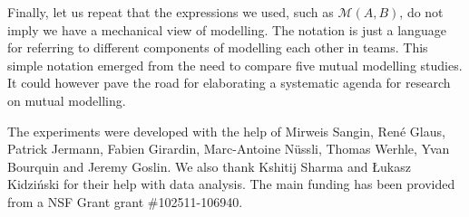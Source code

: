 \documentclass[natbib]{svjour3}
\newcommand{\gmodel}[2]{{$\mathcal{M}(#1, #2)$}}
\begin{document}
Finally, let us repeat that the expressions we used, such as \gmodel{A}{B}, do
not imply we have a mechanical view of modelling. The notation is just a language for
referring to different components of modelling each other in teams.  This simple
notation emerged from the need to compare five mutual modelling studies. It
could however pave the road for elaborating a systematic agenda for research on
mutual modelling.

\begin{acknowledgements}

The experiments were developed with the help of Mirweis Sangin, René Glaus,
Patrick Jermann,  Fabien Girardin, Marc-Antoine Nüssli, Thomas Werhle, Yvan
Bourquin and Jeremy Goslin.  We also thank Kshitij Sharma and {\L}ukasz
Kidzi\'nski for their help with data analysis. The main funding has been
provided from a NSF Grant grant \#102511-106940.

\end{acknowledgements}



\end{document}
